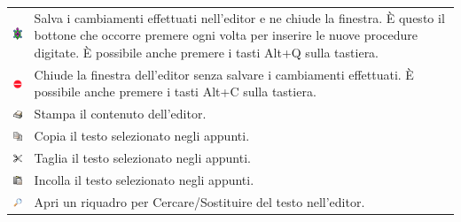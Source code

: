 \begin{longtable}{cm{12cm}}
	\includegraphics*[scale=1]{pics/interface-turtle.png} &
	Salva i cambiamenti effettuati nell'editor e ne chiude la finestra. È questo il bottone che occorre premere ogni volta per inserire le nuove procedure digitate. È possibile anche premere i tasti Alt+Q sulla tastiera.\\
	\includegraphics*[scale=1]{pics/interface-quit.png}&
	Chiude la finestra dell'editor senza salvare i cambiamenti effettuati. È possibile anche premere i tasti Alt+C sulla tastiera.\\
	\includegraphics*[scale=1]{pics/interface-fileprint.png}&
	Stampa il contenuto dell'editor.\\
	\includegraphics*[scale=1]{pics/interface-editcopy.png}&
	Copia il testo selezionato negli appunti.\\
	\includegraphics*[scale=1]{pics/interface-editcut.png}&
	Taglia il testo selezionato negli appunti.\\
	\includegraphics*[scale=1]{pics/interface-editpaste.png}&
	Incolla il testo selezionato negli appunti.\\
	\includegraphics*[scale=1]{pics/interface-chercher.png}&
	Apri un riquadro per Cercare/Sostituire del testo nell'editor.\\
\end{longtable}
